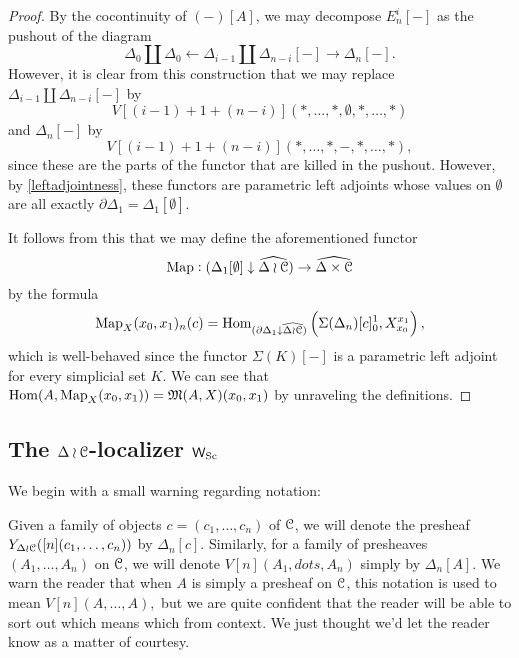 \begin{proof}
By the cocontinuity of \((-)[A]\), we may decompose \(E_n^i[-]\) as the pushout of the diagram \[\Delta_0\coprod \Delta_0 \leftarrow \Delta_{i-1} \coprod \Delta_{n-i}[-] \rightarrow \Delta_n[-].\]  However, it is clear from this construction that we may replace \(\Delta_{i-1} \coprod \Delta_{n-i}[-]\) by \[V[(i-1)+1+(n-i)](\ast,\dots,\ast,\emptyset,\ast,\dots,\ast)\] and \(\Delta_n[-]\) by \[V[(i-1)+1+(n-i)](\ast,\dots,\ast,-,\ast,\dots,\ast),\] since these are the parts of the functor that are killed in the pushout.  However, by \eqref{leftadjointness}, these functors are parametric left adjoints whose values on \(\emptyset\) are all exactly \(\partial \Delta_1=\Delta_1[\emptyset]\).  

It follows from this that we may define the aforementioned functor \[\operatorname{Map}:{(\Delta_1[\emptyset]\downarrow \widehat{\Delta\wr \mathcal{C}})}\to \widehat{\Delta\times \mathcal{C}}\] by the formula \[\operatorname{Map}_X(x_0,x_1)_n(c)={\operatorname{Hom}}_{{(\partial \Delta_1\downarrow \widehat{\Delta\wr \mathcal{C}})}}\left(\Sigma(\Delta_n)[c]_0^1, X_{x_0}^{x_1}\right),\] which is well-behaved since the functor \(\Sigma(K)[-]\) is a parametric left adjoint for every simplicial set \(K\).  We can see that \({\operatorname{Hom}}(A,\operatorname{Map}_X(x_0,x_1))=\mathfrak{M}(A,X)(x_0,x_1)\) by unraveling the definitions.
\end{proof}

\subsection{The $\Delta\wr \mathcal{C}$-localizer $\mathsf{W}_{{\operatorname{Sc}}}$}
We begin with a small warning regarding notation:

\begin{note} Given a family of objects \(c=(c_1,\dots,c_n)\) of \(\mathcal{C}\), we will denote the presheaf \(Y_{\Delta\wr \mathcal{C}}([n](c_1,\dots, c_n))\) by \(\Delta_n[c]\).  Similarly, for a family of presheaves \((A_1,\dots,A_n)\) on \(\mathcal{C}\), we will denote \(V[n](A_1,dots,A_n)\) simply by \(\Delta_n[A]\).  We warn the reader that when \(A\) is simply a presheaf on \(\mathcal{C}\), this notation is used to mean \(V[n](A,\dots,A),\) but we are quite confident that the reader will be able to sort out which means which from context.  We just thought we'd let the reader know as a matter of courtesy.
\end{note}

